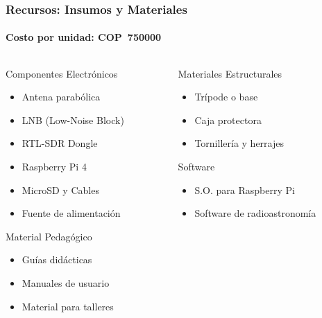\begin{frame}
  \frametitle{Recursos: Insumos y Materiales}
  \framesubtitle{Costo por unidad: \textbf{COP~\num{750000}}}

  \begin{columns}[T] %
    \begin{column}{0.5\textwidth}
      \begin{block}{Componentes Electrónicos}
        \begin{itemize}
          \item Antena parabólica
          \item LNB (Low-Noise Block)
          \item RTL-SDR Dongle
          \item Raspberry Pi 4
          \item MicroSD y Cables
          \item Fuente de alimentación
        \end{itemize}
      \end{block}
      \begin{block}{Material Pedagógico}
        \begin{itemize}
          \item Guías didácticas
          \item Manuales de usuario
          \item Material para talleres
        \end{itemize}
      \end{block}
    \end{column}
    \begin{column}{0.5\textwidth}
      \begin{block}{Materiales Estructurales}
        \begin{itemize}
          \item Trípode o base
          \item Caja protectora
          \item Tornillería y herrajes
        \end{itemize}
      \end{block}
      \begin{block}{Software}
        \begin{itemize}
          \item S.O. para Raspberry Pi
          \item Software de radioastronomía
        \end{itemize}
      \end{block}
    \end{column}
  \end{columns}
\end{frame}

